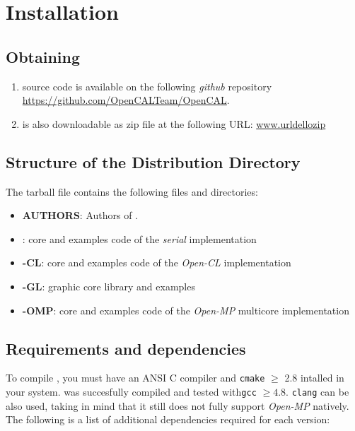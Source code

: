 \chapter{Installation} 
\label{ch:installation}



\section{Obtaining \texttt{\ocal}}

\begin{enumerate}
\item  \texttt{\ocal} source code is available on the following \emph{github} repository \url{https://github.com/OpenCALTeam/OpenCAL}. 

\item \texttt{\ocal} is also downloadable as zip file at the following URL: \url{www.urldellozip}
\end{enumerate}




\section{Structure of the Distribution Directory}

The tarball file contains the following files and directories:

\begin{itemize}

	
    \item \textbf{AUTHORS}: Authors of \texttt{\ocal}.
	\item \textbf{\ocal}: core and examples code of the \emph{serial} implementation  
	\item \textbf{\ocal-CL}:  core and examples code of the \emph{Open-CL} implementation  
	\item \textbf{\ocal-GL}:  \texttt{\ocal} graphic core library and examples   
	\item \textbf{\ocal-OMP}:  core and examples code of the \emph{Open-MP}  multicore implementation  

\end{itemize}


\section{Requirements and dependencies}

To compile \texttt{\ocal}, you must have an ANSI C compiler and \texttt{cmake} $\geq$ 2.8 intalled in your system.
\ocal was succesfully compiled and tested with\texttt{gcc} $\geq 4.8$. \texttt{clang} can be also used, taking in mind that it still does not fully support  \emph{Open-MP} natively.
The following is a list of additional dependencies required for each \ocal version:

